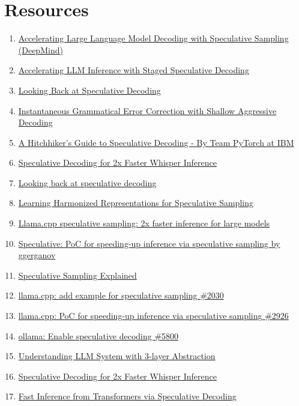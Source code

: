 \documentclass[a4paper,12pt]{report}
\begin{document}
\section*{Resources}
\begin{enumerate}
    \item \href{https://arxiv.org/abs/2302.01318}{Accelerating Large Language Model Decoding with Speculative Sampling (DeepMind)}
    \item \href{https://arxiv.org/abs/2308.04623}{Accelerating LLM Inference with Staged Speculative Decoding}
    \item \href{https://news.ycombinator.com/item?id=43216518}{Looking Back at Speculative Decoding}
    \item \href{https://arxiv.org/abs/2106.04970}{Instantaneous Grammatical Error Correction with Shallow Aggressive Decoding}
    \item \href{https://pytorch.org/blog/hitchhikers-guide-speculative-decoding/}{A Hitchhiker’s Guide to Speculative Decoding - By Team PyTorch at IBM}
    \item \href{https://colab.research.google.com/github/sanchit-gandhi/notebooks/blob/main/speculative_decoding.ipynb#scrollTo=baf87589-b7fe-45dd-a6f6-9b9223581562}{Speculative Decoding for 2x Faster Whisper Inference}
    \item \href{https://research.google/blog/looking-back-at-speculative-decoding/}{Looking back at speculative decoding}
    \item \href{https://arxiv.org/abs/2408.15766}{Learning Harmonized Representations for Speculative Sampling}
    \item \href{https://news.ycombinator.com/item?id=37390024}{Llama.cpp speculative sampling: 2x faster inference for large models}
    \item \href{https://news.ycombinator.com/item?id=37357783}{Speculative: PoC for speeding-up inference via speculative sampling by ggerganov}
    \item \href{https://saibo-creator.github.io/post/2024_03_08_speculative_sampling/}{Speculative Sampling Explained}
    \item \href{https://github.com/ggml-org/llama.cpp/issues/2030}{llama.cpp: add example for speculative sampling \#2030}
    \item \href{https://github.com/ggml-org/llama.cpp/pull/2926}{llama.cpp: PoC for speeding-up inference via speculative sampling \#2926}
    \item \href{https://github.com/ollama/ollama/issues/5800}{ollama: Enable speculative decoding \#5800}
    \item \href{https://ralphmao.github.io/ML-software-system/}{Understanding LLM System with 3-layer Abstraction}
    \item \href{https://huggingface.co/blog/whisper-speculative-decoding}{Speculative Decoding for 2x Faster Whisper Inference}
    \item \href{https://arxiv.org/abs/2211.17192}{Fast Inference from Transformers via Speculative Decoding}
\end{enumerate}
\end{document}
